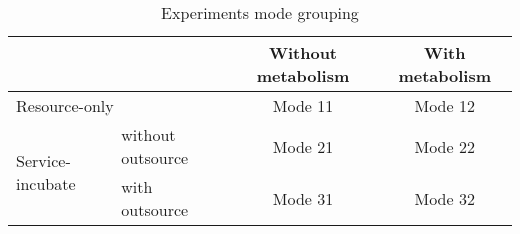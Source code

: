 \begin{table}[htbp]
  \centering
  \scriptsize
  \caption{Experiments mode grouping}
    \begin{tabular}{llcc}
    \toprule
          &       & Without metabolism & With metabolism \\
    \midrule
    \multicolumn{2}{l}{Resource-only} & Mode 11 & Mode 12 \\\hline
    \multicolumn{1}{l}{\multirow{2}[0]{*}{Service-incubate}} & without outsource & Mode 21 &Mode 22 \\\cline{2-4}
    \multicolumn{1}{l}{} & with outsource & Mode 31 & Mode 32 \\
    \bottomrule
    \end{tabular}%
  \label{tab:grouping}%
\end{table}%

